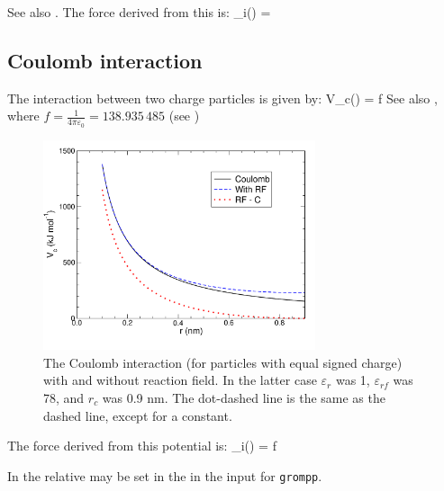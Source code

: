 See also .  The force derived from this is:
\beq
 _i(\rij) =  \rnorm
\eeq


\subsection{Coulomb interaction}
\label{sec:coul}
\newcommand{\epsr}{\varepsilon_r}
\newcommand{\epsrf}{\varepsilon_{rf}}
The  interaction between two charge particles is given by:
\beq
V_c(\rij) = f \frac{q_i q_j}{\epsr \rij}
\label{eqn:vcoul}
\eeq
See also , where $f = \frac{1}{4\pi \varepsilon_0} =
138.935\,485$ (see )

\begin{figure}
\centerline{\includegraphics[width=8cm]{plots/vcrf}}
\caption[The Coulomb interaction with and without reaction field.]{The
Coulomb interaction (for particles with equal signed charge) with and
without reaction field. In the latter case $\epsr$ was 1, $\epsrf$ was 78,
and $r_c$ was 0.9 nm.
The dot-dashed line is the same as the dashed line, except for a constant.}
\label{fig:coul}
\end{figure}

The force derived from this potential is:
\beq
{}_i(\rvij) = f \frac{q_i q_j}{\epsr\rij^2}\rnorm
\eeq

In {\gromacs} the  relative  
\normindex{$\epsr$}
may be set in the in the input for {\tt grompp}. 


